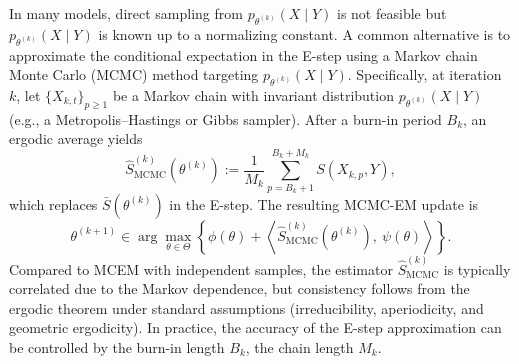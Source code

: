 \documentclass[english,graybox,envcountchap,envcountsame,sectrefs,shortlabels]{svmono}
\theoremstyle{style}
\begin{document}
In many models, direct sampling from $p_{\theta^{(k)}}(X\mid Y)$ is not feasible but $p_{\theta^{(k)}}(X\mid Y)$  is known up to a normalizing constant. A common alternative is to approximate the conditional expectation in the E-step using
a Markov chain Monte Carlo (MCMC) method targeting $p_{\theta^{(k)}}(X\mid Y)$. Specifically, at iteration $k$, let $\{X_{k,t}\}_{p\ge 1}$ be a Markov chain with
invariant distribution $p_{\theta^{(k)}}(X\mid Y)$ (e.g., a Metropolis--Hastings or
Gibbs sampler). After a burn-in period $B_k$, an ergodic average yields
\[
\widehat S^{(k)}_{\mathrm{MCMC}}(\theta^{(k)})
:= \frac{1}{M_k}\sum_{p=B_k+1}^{B_k+M_k} S\!\left(X_{k,p},Y\right),
\]
which replaces $\bar S(\theta^{(k)})$ in the E-step. The resulting MCMC-EM update is
\[
\theta^{(k+1)} \in \arg\max_{\theta\in\Theta}\left\{
\phi(\theta) + \left\langle \widehat S^{(k)}_{\mathrm{MCMC}}(\theta^{(k)}),\ \psi(\theta)\right\rangle
\right\}.
\]
Compared to MCEM with independent samples, the estimator
$\widehat S^{(k)}_{\mathrm{MCMC}}$ is typically correlated due to the Markov
dependence, but consistency follows from the ergodic theorem under standard
assumptions (irreducibility, aperiodicity, and geometric ergodicity). In practice,
the accuracy of the E-step approximation can be controlled by the burn-in length
$B_k$, the chain length $M_k$.
\end{document}
